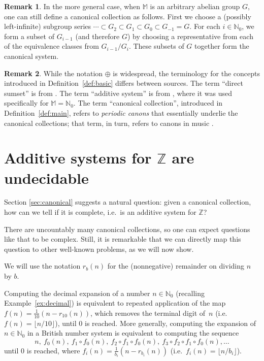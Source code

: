 \documentclass[12pt]{article}
\theoremstyle{definition}
\newtheorem{remark}{Remark}
\newcommand{\N}{\mathbb{N}}
\newcommand{\Z}{\mathbb{Z}}
\begin{document}
\begin{remark}
In the more general case, when $\mathbb{M}$ is an arbitrary abelian group $G$, one can still define a canonical collection as follows. First we choose a (possibly left-infinite) subgroup series $\dotsb\subset G_2 \subset G_1 \subset G_0 \subset G_{-1}=G$. For each $i\in\N_0$, we form a subset of $G_{i-1}$ (and therefore $G$) by choosing a representative from each of the equivalence classes from $G_{i-1}/G_i$. These subsets of $G$ together form the canonical system.
\end{remark}

\begin{remark}
While the notation $\oplus$ is widespread, the terminology for the concepts introduced in Definition~\ref{def:basic} differs between sources. The term ``direct sumset'' is from \cite{book:ww}. The term ``additive system'' is from \cite{Nathanson}, where it was used specifically for $\mathbb{M}=\N_0$.
The term ``canonical collection'', introduced in Definition~\ref{def:main}, refers to \emph{periodic canons} that essentially underlie the canonical collections; that term, in turn, refers to canons in music \cite{aperiodic}.
\end{remark}

\section{Additive systems for $\Z$ are undecidable}
\label{sec:undecidable}
Section \ref{sec:canonical} suggests a natural question: given a canonical collection, how can we tell if it is complete, i.e.\ is an additive system for $\Z$?

There are uncountably many canonical collections, so one can expect questions like that to be complex. Still, it is remarkable that we can directly map this question to other well-known problems, as we will now show.

We will use the notation $r_b(n)$ for the (nonnegative) remainder on dividing $n$ by $b$.

Computing the decimal expansion of a number $n\in\N_0$ (recalling Example~\ref{ex:decimal}) is equivalent to repeated application of the map $f(n) = \frac{1}{10}(n - r_{10}(n))$, which removes the terminal digit of~$n$ (i.e.\ $f(n) = \lfloor n/10 \rfloor$), until $0$ is reached. More generally, computing the expansion of $n\in\N_0$ in a British number system is equivalent to computing the sequence
\begin{equation}
\label{eq:f-iter}
n,\ f_0(n),\ f_1\circ f_0(n),\ f_2\circ f_1\circ f_0(n),\ f_3\circ f_2\circ f_1\circ f_0(n), \dotsc
\end{equation}
until $0$ is reached, where $f_i(n) = \frac{1}{b_i}\left(n - r_{b_i}(n)\right)$ (i.e.\ $f_i(n) = \lfloor n/b_i \rfloor$).
\end{document}
